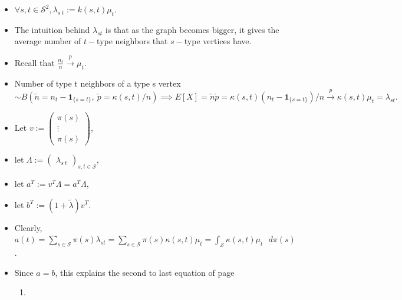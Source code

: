 \documentclass[
  letterpaper,
  DIV=11,
  numbers=noendperiod]{scrartcl}
\providecommand{\tightlist}{%
  \setlength{\itemsep}{0pt}\setlength{\parskip}{0pt}}\usepackage{longtable,booktabs,array}
\begin{document}
\begin{itemize}
\item
  \(\forall s, t \in \mathcal{S}^2, \lambda_{\boxed{s} \: t} := k(s, t) \mu_t.\)
\item
  The intuition behind \(\lambda_{\boxed{s} t}\) is that as the graph
  becomes bigger, it gives the average number of \(t-\)type neighbors
  that \(s-\)type vertices have.
\item
  Recall that \(\frac{n_t}{n} \xrightarrow{p} \mu_t\).
\item
  Number of type t neighbors of a type s vertex
  \(\sim B(\tilde{n} = n_t - \mathbf{1}_{\{s = t\}}, \: \tilde{p} = \kappa(s, t) /n) \implies E[X] = \tilde{n} \tilde{p} = \kappa(s, t) (n_t - \mathbf{1}_{\{s = t\}}) / n \xrightarrow{p} \kappa(s, t) \mu_t = \lambda_{\boxed{s} t}.\)
\end{itemize}

\begin{itemize}
\item
  Let \(v := \begin{pmatrix} \pi(s) \\ \vdots \\ \pi(s) \end{pmatrix}\),
\item
  let
  \(\Lambda := \begin{pmatrix} \lambda_{\boxed{s} \: t} \end{pmatrix}_{s, t \in \mathcal{S}}\),
\item
  let \(a^T := v^T \Lambda = a^T \Lambda\),
\item
  let \(b^T := (1 + \tilde{\lambda}) v^T\).
\item
  Clearly,
  \(a(t) = \sum_{s \in \mathcal{S}} \pi(s) \lambda_{\boxed{s} t} = \sum_{s \in \mathcal{S}} \pi(s) \kappa(s, t) \mu_t = \int_{\mathcal{S}} \kappa(s, t) \mu_t \text{ } d\pi(s)\).
\item
  Since \(a = b\), this explains the second to last equation of page

  \begin{enumerate}
  \def\labelenumi{\arabic{enumi}.}
  \setcounter{enumi}{590}
  \tightlist
  \item
  \end{enumerate}
\end{itemize}
\end{document}
